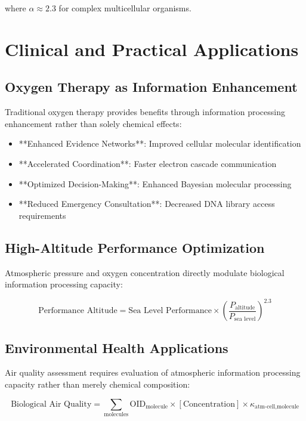 \documentclass[twocolumn]{article}
\begin{document}
where $\alpha \approx 2.3$ for complex multicellular organisms.

\section{Clinical and Practical Applications}

\subsection{Oxygen Therapy as Information Enhancement}

Traditional oxygen therapy provides benefits through information processing enhancement rather than solely chemical effects:

\begin{itemize}
\item **Enhanced Evidence Networks**: Improved cellular molecular identification
\item **Accelerated Coordination**: Faster electron cascade communication
\item **Optimized Decision-Making**: Enhanced Bayesian molecular processing
\item **Reduced Emergency Consultation**: Decreased DNA library access requirements
\end{itemize}

\subsection{High-Altitude Performance Optimization}

Atmospheric pressure and oxygen concentration directly modulate biological information processing capacity:

\begin{equation}
\text{Performance Altitude} = \text{Sea Level Performance} \times \left(\frac{P_{\text{altitude}}}{P_{\text{sea level}}}\right)^{2.3}
\end{equation}

\subsection{Environmental Health Applications}

Air quality assessment requires evaluation of atmospheric information processing capacity rather than merely chemical composition:

\begin{equation}
\text{Biological Air Quality} = \sum_{\text{molecules}} \text{OID}_{\text{molecule}} \times [\text{Concentration}] \times \kappa_{\text{atm-cell,molecule}}
\end{equation}
\end{document}
